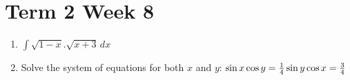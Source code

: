 \documentclass[../main.tex]{subfiles}
\begin{document}
\section*{Term 2 Week 8}
\begin{enumerate}
    \item 
    \(\int \sqrt{1-x}.\sqrt{x+3}\,dx\)

    \item 
    Solve the system of equations for both \(x\) and \(y\):
    $
    \sin{x}\cos{y}=\frac{1}{4}\\
    \sin{y}\cos{x}=\frac{3}{4}
    $
    
    
    \end{enumerate}
\end{document}
